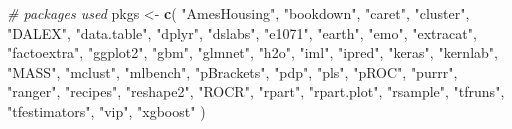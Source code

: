 \documentclass[]{krantz}
\makeatletter
\newenvironment{Shaded}{\begin{snugshade}}{\end{snugshade}}
\newcommand{\CommentTok}[1]{\textcolor[rgb]{0.37,0.37,0.37}{\textit{#1}}}
\newcommand{\KeywordTok}[1]{\textcolor[rgb]{0.27,0.27,0.27}{\textbf{#1}}}
\newcommand{\NormalTok}[1]{#1}
\newcommand{\StringTok}[1]{\textcolor[rgb]{0.5,0.5,0.5}{#1}}
\newenvironment{kframe}{%
\medskip{}
\setlength{\fboxsep}{.8em}
 \def\at@end@of@kframe{}%
 \ifinner\ifhmode%
  \def\at@end@of@kframe{\end{minipage}}%
  \begin{minipage}{\columnwidth}%
 \fi\fi%
 \def\FrameCommand##1{\hskip\@totalleftmargin \hskip-\fboxsep
 \colorbox{shadecolor}{##1}\hskip-\fboxsep
     \hskip-\linewidth \hskip-\@totalleftmargin \hskip\columnwidth}%
 \MakeFramed {\advance\hsize-\width
   \@totalleftmargin\z@ \linewidth\hsize
   \@setminipage}}%
 {\par\unskip\endMakeFramed%
 \at@end@of@kframe}
\renewenvironment{Shaded}{\begin{kframe}}{\end{kframe}}
\makeatother
\begin{document}
\begin{Shaded}
\begin{Highlighting}[]
\CommentTok{# packages used}
\NormalTok{pkgs <-}\StringTok{ }\KeywordTok{c}\NormalTok{(}
  \StringTok{"AmesHousing"}\NormalTok{,}
  \StringTok{"bookdown"}\NormalTok{,}
  \StringTok{"caret"}\NormalTok{,}
  \StringTok{"cluster"}\NormalTok{,}
  \StringTok{"DALEX"}\NormalTok{,}
  \StringTok{"data.table"}\NormalTok{,}
  \StringTok{"dplyr"}\NormalTok{,}
  \StringTok{"dslabs"}\NormalTok{,}
  \StringTok{"e1071"}\NormalTok{,}
  \StringTok{"earth"}\NormalTok{,}
  \StringTok{"emo"}\NormalTok{,}
  \StringTok{"extracat"}\NormalTok{,}
  \StringTok{"factoextra"}\NormalTok{,}
  \StringTok{"ggplot2"}\NormalTok{,}
  \StringTok{"gbm"}\NormalTok{,}
  \StringTok{"glmnet"}\NormalTok{,}
  \StringTok{"h2o"}\NormalTok{,}
  \StringTok{"iml"}\NormalTok{,}
  \StringTok{"ipred"}\NormalTok{,}
  \StringTok{"keras"}\NormalTok{,}
  \StringTok{"kernlab"}\NormalTok{,}
  \StringTok{"MASS"}\NormalTok{,}
  \StringTok{"mclust"}\NormalTok{,}
  \StringTok{"mlbench"}\NormalTok{,}
  \StringTok{"pBrackets"}\NormalTok{,}
  \StringTok{"pdp"}\NormalTok{,}
  \StringTok{"pls"}\NormalTok{,}
  \StringTok{"pROC"}\NormalTok{,}
  \StringTok{"purrr"}\NormalTok{,}
  \StringTok{"ranger"}\NormalTok{,}
  \StringTok{"recipes"}\NormalTok{,}
  \StringTok{"reshape2"}\NormalTok{,}
  \StringTok{"ROCR"}\NormalTok{,}
  \StringTok{"rpart"}\NormalTok{,}
  \StringTok{"rpart.plot"}\NormalTok{,}
  \StringTok{"rsample"}\NormalTok{,}
  \StringTok{"tfruns"}\NormalTok{,}
  \StringTok{"tfestimators"}\NormalTok{,}
  \StringTok{"vip"}\NormalTok{,}
  \StringTok{"xgboost"}
\NormalTok{)}


\end{Highlighting}
\end{Shaded}
\end{document}
